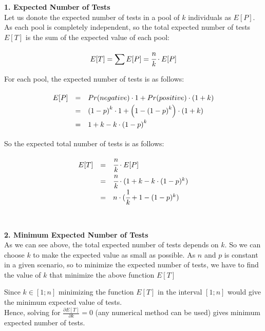 \textbf{1. Expected Number of Tests}\\

Let us donote the expected number of tests in a pool of $k$ individuals as $E[P]$. As each pool is completely independent, so the total expected number of tests $E[T]$ is the sum of the expected value of each pool:

\[
  E[T] = \sum E[P] = \cfrac{n}{k} \cdot E[P]
\]

For each pool, the expected number of tests is as follows:

\[\def\arraystretch{1.5}
  \begin{array}{l l l}
        E[P] & = & Pr(negative) \cdot 1 + Pr(positive) \cdot (1 + k) \\
             & = & \left(1 - p\right)^k \cdot 1 + \left(1 - \left(1 - p \right)^k \right) \cdot \left(1 + k \right) \\
             & = & 1 + k - k \cdot \left(1 - p \right)^k
  \end{array}
\]

So the expected total number of tests is as follows:

\[\def\arraystretch{1.5}
  \begin{array}{l l l}
        E[T] & = & \cfrac{n}{k} \cdot E[P] \\
             & = & \cfrac{n}{k} \cdot ( 1 + k - k \cdot (1 - p )^k) \\
             & = & n \cdot ( \cfrac{1}{k} + 1 - (1 - p)^k )
  \end{array}
\]\\\\

\noindent
\textbf{2. Minimum Expected Number of Tests}\\

As we can see above, the total expected number of tests depends on $k$. So we can choose $k$ to make the expected value as small as possible. As $n$ and $p$ is constant in a given scenario, so to minimize the expected number of tests, we have to find the value of $k$ that minimize the above function $E[T]$


Since $k \in [1 ; n]$ minimizing the function $E[T]$ in the interval $[1 ; n]$ would give the minimum expected value of tests. \\
Hence, solving for $\frac{\partial E[T]}{\partial k} = 0$ (any numerical method can be used) gives minimum expected number of tests. \\




